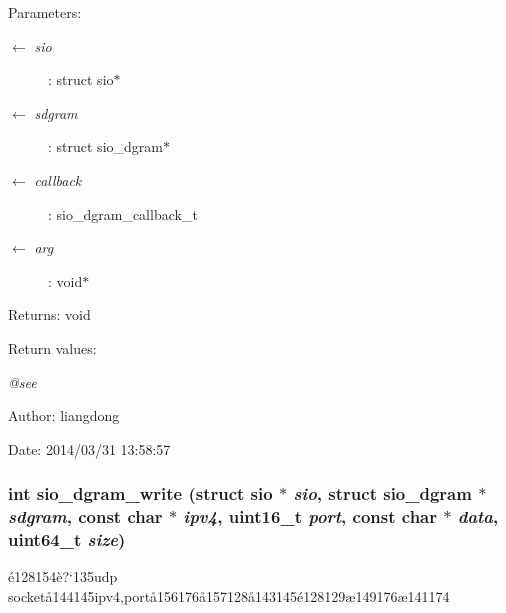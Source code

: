 \begin{Desc}
\item[Parameters:]
\begin{description}
\item[\mbox{$\leftarrow$} {\em sio}]: struct sio$\ast$ \item[\mbox{$\leftarrow$} {\em sdgram}]: struct sio\_\-dgram$\ast$ \item[\mbox{$\leftarrow$} {\em callback}]: sio\_\-dgram\_\-callback\_\-t \item[\mbox{$\leftarrow$} {\em arg}]: void$\ast$ \end{description}
\end{Desc}
\begin{Desc}
\item[Returns:]void \end{Desc}
\begin{Desc}
\item[Return values:]
\begin{description}
\item[{\em @see}]\end{description}
\end{Desc}
\begin{Desc}
\item[Author:]liangdong \end{Desc}
\begin{Desc}
\item[Date:]2014/03/31 13:58:57 \end{Desc}
\subsubsection{\setlength{\rightskip}{0pt plus 5cm}int sio\_\-dgram\_\-write (struct sio $\ast$ {\em sio}, struct sio\_\-dgram $\ast$ {\em sdgram}, const char $\ast$ {\em ipv4}, uint16\_\-t {\em port}, const char $\ast$ {\em data}, uint64\_\-t {\em size})}\label{sio__dgram_8c_a4}


\'{e}128154\`{e}?`135udp socket\aa{}144145ipv4,port\aa{}156176\aa{}157128\aa{}143145\'{e}128129\ae{}149176\ae{}141174 

